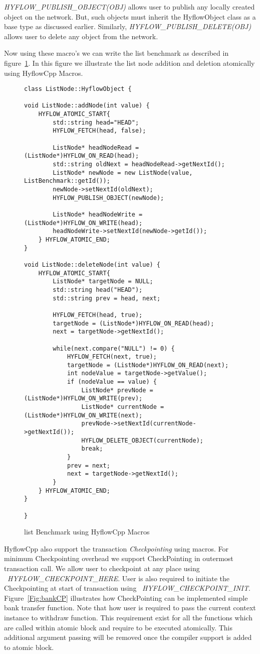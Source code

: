 \documentclass[12pt,english]{report}
\begin{document}
\emph{HYFLOW{\_}PUBLISH{\_}OBJECT(OBJ)} allows user to publish any locally created object on the network. But, such objects must inherit the HyflowObject class as a base type as discussed earlier. Similarly, \emph{HYFLOW{\_}PUBLISH{\_}DELETE(OBJ)} allows user to delete any object from the network.

Now using these macro's we can write the list benchmark as described in figure~\ref{Fig:listMacro}. In this figure we illustrate the list node addition and deletion atomically using HyflowCpp Macros. 
\begin{figure}
\centering
\begin{lstlisting}
class ListNode::HyflowObject {

void ListNode::addNode(int value) {
	HYFLOW_ATOMIC_START{
		std::string head="HEAD";
		HYFLOW_FETCH(head, false);

		ListNode* headNodeRead =  (ListNode*)HYFLOW_ON_READ(head);
		std::string oldNext = headNodeRead->getNextId();
		ListNode* newNode = new ListNode(value, ListBenchmark::getId());
		newNode->setNextId(oldNext);
		HYFLOW_PUBLISH_OBJECT(newNode);

		ListNode* headNodeWrite = (ListNode*)HYFLOW_ON_WRITE(head);
		headNodeWrite->setNextId(newNode->getId());
	} HYFLOW_ATOMIC_END;
}

void ListNode::deleteNode(int value) {
	HYFLOW_ATOMIC_START{
		ListNode* targetNode = NULL;
		std::string head("HEAD");
		std::string prev = head, next;

		HYFLOW_FETCH(head, true);
		targetNode = (ListNode*)HYFLOW_ON_READ(head);
		next = targetNode->getNextId();

		while(next.compare("NULL") != 0) {
			HYFLOW_FETCH(next, true);
			targetNode = (ListNode*)HYFLOW_ON_READ(next);
			int nodeValue = targetNode->getValue();
			if (nodeValue == value) {
				ListNode* prevNode = (ListNode*)HYFLOW_ON_WRITE(prev);
				ListNode* currentNode = (ListNode*)HYFLOW_ON_WRITE(next);
				prevNode->setNextId(currentNode->getNextId());
				HYFLOW_DELETE_OBJECT(currentNode);
				break;
			}
			prev = next;
			next = targetNode->getNextId();
		}
	} HYFLOW_ATOMIC_END;
}

}
\end{lstlisting}
\caption{list Benchmark using HyflowCpp Macros}
\label{Fig:listMacro}
\end{figure}

HyflowCpp also support the transaction \emph{Checkpointing} using macros. For minimum Checkpointing overhead we support CheckPointing in outermost transaction call. We allow user to checkpoint at any place using ~\emph{HYFLOW{\_}CHECKPOINT{\_}HERE}. User is also required to initiate the Checkpointing at start of transaction using ~\emph{HYFLOW{\_}CHECKPOINT{\_}INIT}. Figure~\ref{Fig:bankCP} illustrates how CheckPointing can be implemented simple bank transfer function. Note that how user is required to pass the current context instance to withdraw function. This requirement exist for all the functions which are called within atomic block and require to be executed atomically. This additional argument passing will be removed once the compiler support is added to atomic block. 
\end{document}
